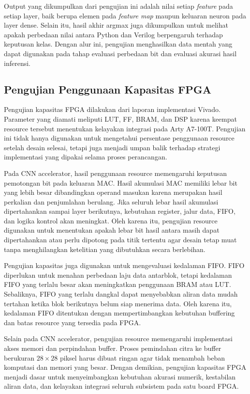 	Output yang dikumpulkan dari pengujian ini adalah nilai setiap \emph{feature}
	pada setiap layer, baik berupa elemen pada \emph{feature map} maupun keluaran
	neuron pada layer dense. Selain itu, hasil akhir argmax juga dikumpulkan untuk
	melihat apakah perbedaan nilai antara Python dan Verilog berpengaruh terhadap
	keputusan kelas. Dengan alur ini, pengujian menghasilkan data mentah yang
	dapat digunakan pada tahap evaluasi perbedaan bit dan evaluasi akurasi hasil
	inferensi.
    \subsection{Pengujian Penggunaan Kapasitas FPGA}
	Pengujian kapasitas FPGA dilakukan dari laporan implementasi Vivado. Parameter
	yang diamati meliputi LUT, FF, BRAM, dan DSP karena keempat resource tersebut
	menentukan kelayakan integrasi pada Arty A7-100T. Pengujian ini tidak hanya
	digunakan untuk mengetahui persentase penggunaan resource setelah desain
	selesai, tetapi juga menjadi umpan balik terhadap strategi implementasi yang
	dipakai selama proses perancangan.

	Pada CNN accelerator, hasil penggunaan resource memengaruhi keputusan
	pemotongan bit pada keluaran MAC. Hasil akumulasi MAC memiliki lebar bit yang
	lebih besar dibandingkan operand masukan karena merupakan hasil perkalian dan
	penjumlahan berulang. Jika seluruh lebar hasil akumulasi dipertahankan sampai
	layer berikutnya, kebutuhan register, jalur data, FIFO, dan logika kontrol akan
	meningkat. Oleh karena itu, pengujian resource digunakan untuk menentukan
	apakah lebar bit hasil antara masih dapat dipertahankan atau perlu dipotong
	pada titik tertentu agar desain tetap muat tanpa menghilangkan ketelitian yang
	dibutuhkan secara berlebihan.

	Pengujian kapasitas juga digunakan untuk mengevaluasi kedalaman FIFO. FIFO
	diperlukan untuk menahan perbedaan laju data antarblok, tetapi kedalaman FIFO
	yang terlalu besar akan meningkatkan penggunaan BRAM atau LUT. Sebaliknya,
	FIFO yang terlalu dangkal dapat menyebabkan aliran data mudah tertahan ketika
	blok berikutnya belum siap menerima data. Oleh karena itu, kedalaman FIFO
	ditentukan dengan mempertimbangkan kebutuhan buffering dan batas resource
	yang tersedia pada FPGA.

	Selain pada CNN accelerator, pengujian resource memengaruhi implementasi
	akses memori dan perpindahan buffer. Proses pemindahan citra ke buffer
	berukuran $28 \times 28$ piksel harus dibuat ringan agar tidak menambah
	beban komputasi dan memori yang besar. Dengan demikian, pengujian kapasitas
	FPGA menjadi dasar untuk menyeimbangkan kebutuhan akurasi numerik,
	kestabilan aliran data, dan kelayakan integrasi seluruh subsistem pada satu
	board FPGA.
